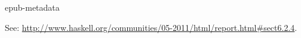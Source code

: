 \begin{hcarentry}{epub-metadata}
\makeheader

See: \url{http://www.haskell.org/communities/05-2011/html/report.html#sect6.2.4}.

% 
% 
% 
% 
\end{hcarentry}
